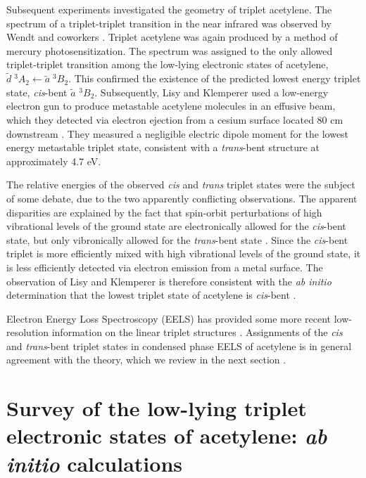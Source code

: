 Subsequent experiments investigated the geometry of triplet acetylene.
The spectrum of a triplet-triplet transition in the near
infrared was observed by Wendt and coworkers \cite{wendt79}.  Triplet
acetylene was again produced by a method of mercury
photosensitization.  The spectrum was assigned to the only allowed
triplet-triplet transition among the low-lying electronic states of
acetylene, $\tilde{d} \; ^3A_2 \leftarrow \tilde{a} \; ^3B_2$.  This
confirmed the existence of the predicted lowest energy triplet state,
\emph{cis}-bent $\tilde{a}$ $^3B_2$.  Subsequently, Lisy and Klemperer
used a low-energy electron gun to produce metastable acetylene
molecules in an effusive beam, which they detected via electron
ejection from a cesium surface located 80 cm downstream \cite{lisy80,
  hemminger76}.  They measured a negligible electric dipole moment for
the lowest energy metastable triplet state, consistent with a
\emph{trans}-bent structure at approximately 4.7 eV.

The relative energies of the observed \emph{cis} and \emph{trans}
triplet states were the subject of some debate, due to the two
apparently conflicting observations.  The apparent disparities are
explained by the fact that spin-orbit perturbations of high
vibrational levels of the ground state are electronically allowed for
the \emph{cis}-bent state, but only vibronically allowed for the
\emph{trans}-bent state \cite{lundberg93}.  Since the \emph{cis}-bent
triplet is more efficiently mixed with high vibrational levels of the
ground state, it is less efficiently detected via electron emission
from a metal surface.  The observation of Lisy and Klemperer is
therefore consistent with the \emph{ab initio} determination that the
lowest triplet state of acetylene is \emph{cis}-bent
\cite{lundberg93}.

Electron Energy Loss Spectroscopy (EELS) has provided some more recent
low-resolution information on the linear triplet structures
\cite{dressler87, swiderek97}.  Assignments of the \emph{cis} and
\emph{trans}-bent triplet states in condensed phase EELS of acetylene
is in general agreement with the theory, which we review in the next
section \cite{malsch98}.


\section{Survey of the low-lying triplet electronic states of
  acetylene: \emph{ab initio} calculations}


